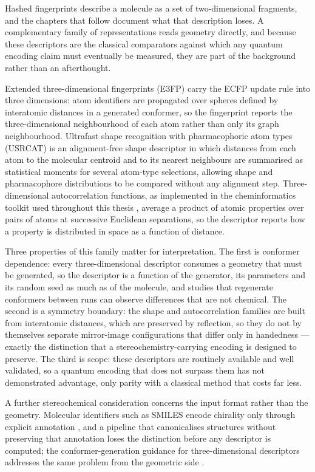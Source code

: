 Hashed fingerprints describe a molecule as a set of two-dimensional fragments, and the chapters that follow document what that description loses. A complementary family of representations reads geometry directly, and because these descriptors are the classical comparators against which any quantum encoding claim must eventually be measured, they are part of the background rather than an afterthought.

Extended three-dimensional fingerprints (E3FP) \cite{Axen2017} carry the ECFP update rule into three dimensions: atom identifiers are propagated over spheres defined by interatomic distances in a generated conformer, so the fingerprint reports the three-dimensional neighbourhood of each atom rather than only its graph neighbourhood. Ultrafast shape recognition with pharmacophoric atom types (USRCAT) \cite{Schreyer2012} is an alignment-free shape descriptor in which distances from each atom to the molecular centroid and to its nearest neighbours are summarised as statistical moments for several atom-type selections, allowing shape and pharmacophore distributions to be compared without any alignment step. Three-dimensional autocorrelation functions, as implemented in the cheminformatics toolkit used throughout this thesis \cite{LandrumRDKit}, average a product of atomic properties over pairs of atoms at successive Euclidean separations, so the descriptor reports how a property is distributed in space as a function of distance.

Three properties of this family matter for interpretation. The first is conformer dependence: every three-dimensional descriptor consumes a geometry that must be generated, so the descriptor is a function of the generator, its parameters and its random seed as much as of the molecule, and studies that regenerate conformers between runs can observe differences that are not chemical. The second is a symmetry boundary: the shape and autocorrelation families are built from interatomic distances, which are preserved by reflection, so they do not by themselves separate mirror-image configurations that differ only in handedness --- exactly the distinction that a stereochemistry-carrying encoding is designed to preserve. The third is scope: these descriptors are routinely available and well validated, so a quantum encoding that does not surpass them has not demonstrated advantage, only parity with a classical method that costs far less.

A further stereochemical consideration concerns the input format rather than the geometry. Molecular identifiers such as SMILES encode chirality only through explicit annotation \cite{Weininger1988}, and a pipeline that canonicalises structures without preserving that annotation loses the distinction before any descriptor is computed; the conformer-generation guidance for three-dimensional descriptors addresses the same problem from the geometric side \cite{Riniker2015}.

